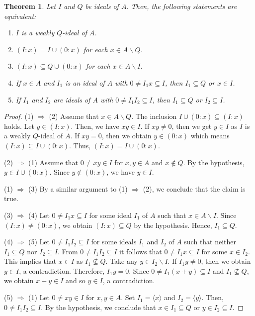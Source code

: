 \documentclass[preprint,review,10pt]{amsart}
\newtheorem{theorem}{Theorem}[section]
\theoremstyle{definition}
\theoremstyle{remark}
\numberwithin{equation}{section}
\begin{document}
\begin{theorem}\label{4}
Let $I$ and $Q$ be  ideals  of $A$. Then, the following statements are equivalent:
\begin{enumerate}
\item $I$ is a weakly $Q$-ideal of $A$.
\item $(I:x)=I \cup (0:x)$ for each $x \in A \backslash  Q$.
\item $(I:x) \subseteq Q \cup (0:x)$ for each $x \in A \backslash I$.
\item If $x \in A$ and $I_1$ is an ideal of $A$ with $0 \neq I_1x\subseteq I$, then $I_1 \subseteq Q$ or $x \in I$.
\item If $I_1$ and $I_2$ are ideals of $A$ with $0 \neq I_1I_2 \subseteq I$, then $I_1 \subseteq Q$ or $I_2 \subseteq I$.
\end{enumerate}
\end{theorem}
\begin{proof}
(1) $\Longrightarrow $ (2) Assume that $x \in A \backslash Q$. The inclusion $I \cup (0 : x) \subseteq (I:x)$ holds. Let $y \in (I : x)$. Then, we have $xy \in I$. If $xy \neq 0$, then we get $y \in I$ as $I$ is a weakly $Q$-ideal of $A$. If $xy=0$, then we obtain $y \in (0:x)$ which means $(I:x) \subseteq I \cup (0:x)$. Thus, $(I:x)=I \cup (0:x)$.

(2) $\Longrightarrow $ (1) Assume that $0 \neq xy \in I$ for $x,y \in A$ and $x \notin Q$. By the hypothesis, $y \in I \cup (0 : x)$. Since $y \notin (0:x)$, we have $y \in I$. 

(1) $\Longrightarrow $ (3) By a similar argument to (1) $\Longrightarrow $ (2), we conclude that  the claim is true.

(3) $\Longrightarrow $ (4) Let $0 \neq I_1 x \subseteq I$    for some ideal $I_1$ of $A$  such that $x \in A \backslash I$. Since  $(I : x) \neq (0 : x)$, we obtain  $(I : x) \subseteq Q$ by the hypothesis. Hence, $I_1 \subseteq Q$.


(4) $\Longrightarrow $ (5) Let $0 \neq I_1I_2 \subseteq I$ for some ideals $I_1$ and $I_2$  of $A$ such that neither $I_1 \subseteq Q$ nor $I_2 \subseteq I$. From $0 \neq I_1I_2 \subseteq I$ it follows that $0 \neq I_1 x \subseteq I$ for some $x \in I_2$. This implies that $x \in I$ as $I_1 \nsubseteq Q$. Take any $y \in I_2 \backslash I$. If $I_1 y \neq 0$, then we obtain $y \in I$, a contradiction. Therefore, $I_1 y=0$. Since $0 \neq I_1(x+y) \subseteq I$ and $I_1 \nsubseteq Q$, we obtain $x+y \in I$ and so $y \in I$, a contradiction. 

(5) $\Longrightarrow $ (1) Let $0 \neq xy \in I$ for $x,y \in A$. Set $I_1=\langle x \rangle$ and $I_2=\langle y \rangle$. Then, $0 \neq I_1 I_2 \subseteq I$. By the hypothesis, we conclude that $x \in I_1 \subseteq Q$ or $y \in I_2 \subseteq I$. 
\end{proof}
\end{document}
